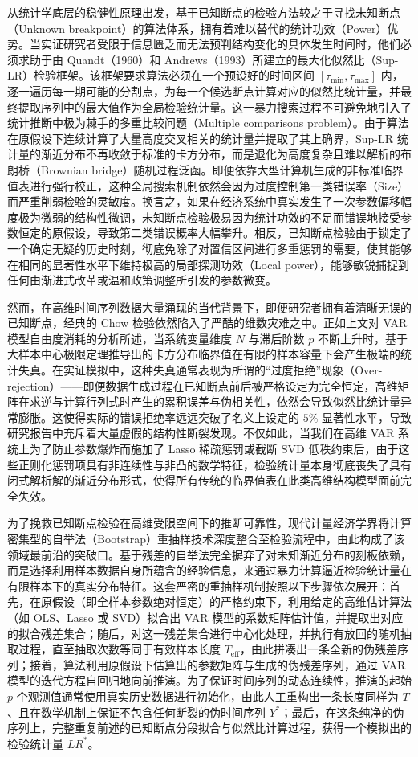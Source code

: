 \documentclass[UTF8,a4paper,12pt]{ctexbook}
\begin{document}
从统计学底层的稳健性原理出发，基于已知断点的检验方法较之于寻找未知断点（Unknown breakpoint）的算法体系，拥有着难以替代的统计功效（Power）优势。当实证研究者受限于信息匮乏而无法预判结构变化的具体发生时间时，他们必须求助于由 Quandt（1960）和 Andrews（1993）所建立的最大化似然比（Sup-LR）检验框架。该框架要求算法必须在一个预设好的时间区间 $[\tau_{\min}, \tau_{\max}]$ 内，逐一遍历每一期可能的分割点，为每一个候选断点计算对应的似然比统计量，并最终提取序列中的最大值作为全局检验统计量。这一暴力搜索过程不可避免地引入了统计推断中极为棘手的多重比较问题（Multiple comparisons problem）。由于算法在原假设下连续计算了大量高度交叉相关的统计量并提取了其上确界，Sup-LR 统计量的渐近分布不再收敛于标准的卡方分布，而是退化为高度复杂且难以解析的布朗桥（Brownian bridge）随机过程泛函。即便依靠大型计算机生成的非标准临界值表进行强行校正，这种全局搜索机制依然会因为过度控制第一类错误率（Size）而严重削弱检验的灵敏度。换言之，如果在经济系统中真实发生了一次参数偏移幅度极为微弱的结构性微调，未知断点检验极易因为统计功效的不足而错误地接受参数恒定的原假设，导致第二类错误概率大幅攀升。相反，已知断点检验由于锁定了一个确定无疑的历史时刻，彻底免除了对置信区间进行多重惩罚的需要，使其能够在相同的显著性水平下维持极高的局部探测功效（Local power），能够敏锐捕捉到任何由渐进式改革或温和政策调整所引发的参数微变。

然而，在高维时间序列数据大量涌现的当代背景下，即便研究者拥有着清晰无误的已知断点，经典的 Chow 检验依然陷入了严酷的维数灾难之中。正如上文对 VAR 模型自由度消耗的分析所述，当系统变量维度 $N$ 与滞后阶数 $p$ 不断上升时，基于大样本中心极限定理推导出的卡方分布临界值在有限的样本容量下会产生极端的统计失真。在实证模拟中，这种失真通常表现为所谓的“过度拒绝”现象（Over-rejection）——即便数据生成过程在已知断点前后被严格设定为完全恒定，高维矩阵在求逆与计算行列式时产生的累积误差与伪相关性，依然会导致似然比统计量异常膨胀。这使得实际的错误拒绝率远远突破了名义上设定的 $5\%$ 显著性水平，导致研究报告中充斥着大量虚假的结构性断裂发现。不仅如此，当我们在高维 VAR 系统上为了防止参数爆炸而施加了 Lasso 稀疏惩罚或截断 SVD 低秩约束后，由于这些正则化惩罚项具有非连续性与非凸的数学特征，检验统计量本身彻底丧失了具有闭式解析解的渐近分布形式，使得所有传统的临界值表在此类高维结构模型面前完全失效。

为了挽救已知断点检验在高维受限空间下的推断可靠性，现代计量经济学界将计算密集型的自举法（Bootstrap）重抽样技术深度整合至检验流程中，由此构成了该领域最前沿的突破口。基于残差的自举法完全摒弃了对未知渐近分布的刻板依赖，而是选择利用样本数据自身所蕴含的经验信息，来通过暴力计算逼近检验统计量在有限样本下的真实分布特征。这套严密的重抽样机制按照以下步骤依次展开：首先，在原假设（即全样本参数绝对恒定）的严格约束下，利用给定的高维估计算法（如 OLS、Lasso 或 SVD）拟合出 VAR 模型的系数矩阵估计值，并提取出对应的拟合残差集合；随后，对这一残差集合进行中心化处理，并执行有放回的随机抽取过程，直至抽取次数等同于有效样本长度 $T_{\mathrm{eff}}$，由此拼凑出一条全新的伪残差序列；接着，算法利用原假设下估算出的参数矩阵与生成的伪残差序列，通过 VAR 模型的迭代方程自回归地向前推演。为了保证时间序列的动态连续性，推演的起始 $p$ 个观测值通常使用真实历史数据进行初始化，由此人工重构出一条长度同样为 $T$、且在数学机制上保证不包含任何断裂的伪时间序列 $Y^*$；最后，在这条纯净的伪序列上，完整重复前述的已知断点分段拟合与似然比计算过程，获得一个模拟出的检验统计量 $LR^*$。
\end{document}
